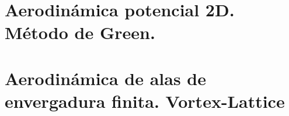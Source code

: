


\chapter{Aerodinámica potencial 2D. Método de Green.}



\chapter{Aerodinámica de alas de envergadura finita. Vortex-Lattice}

